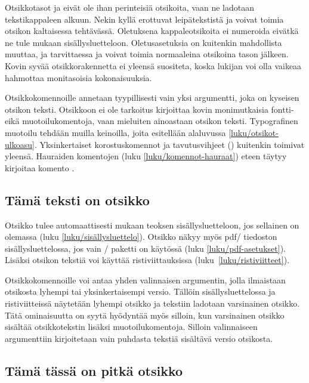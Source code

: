 Otsikkotasot  ja  eivät ole
ihan perinteisiä otsikoita, vaan ne ladotaan tekstikappaleen alkuun.
Nekin kyllä erottuvat leipätekstistä ja voivat toimia otsikon
kaltaisessa tehtävässä. Oletuksena kappaleotsikoita ei numeroida eivätkä
ne tule mukaan sisällysluetteloon. Oletusasetuksia on kuitenkin
mahdollista muuttaa, ja tarvittaessa  ja
 voivat toimia normaaleina otsikoina tason
 jälkeen. Kovin syvää otsikkorakennetta ei
yleensä suositeta, koska lukijan voi olla vaikeaa hahmottaa monitasoisia
kokonaisuuksia.

Otsikkokomennoille annetaan tyypillisesti vain yksi argumentti, joka on
kyseisen otsikon teksti. Otsikkoon ei ole tarkoitus kirjoittaa kovin
monimutkaisia fontti- eikä muotoilukomentoja, vaan mieluiten ainoastaan
otsikon teksti. Typografinen muotoilu tehdään muilla keinoilla, joita
esitellään alaluvussa \ref{luku/otsikot-ulkoasu}. Yksinkertaiset
korostuskomennot ja tavutusvihjeet (\komento{-}) kuitenkin toimivat
yleensä. Hauraiden komentojen (luku \ref{luku/komennot-hauraat}) eteen
täytyy kirjoitaa komento .

\begin{koodilohkosis}
\section{Tämä teksti on otsikko}
\end{koodilohkosis}

\noindent
Otsikko tulee automaattisesti mukaan teoksen sisällysluetteloon, jos
sellainen on olemassa (luku \ref{luku/sisällysluettelo}). Otsikko näkyy
myös pdf\-/ tiedoston sisällysluettelossa, jos vain
\-/ paketti on käytössä (luku
\ref{luku/pdf-asetukset}). Lisäksi otsikon tekstiä voi käyttää
ristiviittauksissa (luku~\ref{luku/ristiviitteet}).

Otsikkokomennoille voi antaa yhden valinnaisen argumentin, jolla
ilmaistaan otsikosta lyhempi tai yksinkertaisempi versio. Tällöin
sisällysluettelossa ja ristiviitteissä näytetään lyhempi otsikko ja
tekstiin ladotaan varsinainen otsikko. Tätä ominaisuutta on syytä
hyödyntää myös silloin, kun varsinainen otsikko sisältää otsikkotekstin
lisäksi muotoilukomentoja. Silloin valinnaiseen argumenttiin
kirjoitetaan vain puhdasta tekstiä sisältävä versio otsikosta.

\begin{koodilohkosis}
\section[Lyhyt otsikko]{Tämä tässä on pitkä otsikko}
\end{koodilohkosis}

